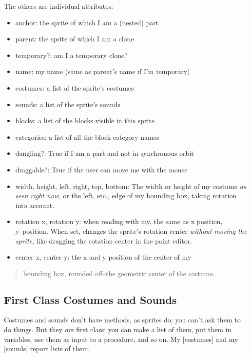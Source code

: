 The others are individual attributes:

\begin{itemize}
\item
  anchor: the sprite of which I am a (nested) part
\item
  parent: the sprite of which I am a clone
\item
  temporary?: am I a temporary clone?
\item
  name: my name (same as parent's name if I'm temporary)
\item
  costumes: a list of the sprite's costumes
\item
  sounds: a list of the sprite's sounds
\item
  blocks: a list of the blocks visible in this sprite
\item
  categories: a list of all the block category names
\item
  dangling?: True if I am a part and not in synchronous orbit
\item
  draggable?: True if the user can move me with the mouse
\item
  width, height, left, right, top, bottom: The width or height of my
  costume \emph{as seen right now,} or the left, etc., edge of my
  bounding box, taking rotation into account.
\item
  rotation x, rotation y: when reading with my, the same as x position,
  y~position. When set, changes the sprite's rotation center
  \emph{without moving the sprite,} like dragging the rotation center in
  the paint editor.
\item
  center x, center y: the x and y position of the center of my
\end{itemize}

\begin{quote}
bounding box, rounded oﬀ--the geometric center of the costume.
\end{quote}

\subsection{First Class Costumes and
Sounds}\label{first-class-costumes-and-sounds}

Costumes and sounds don't have methods, as sprites do; you can't ask
them to do things. But they \emph{are} first class: you can make a list
of them, put them in variables, use them as input to a procedure, and so
on. My {[}costumes{]} and my {[}sounds{]} report lists of them.

